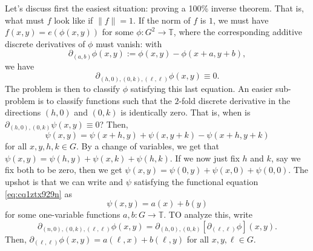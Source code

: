 \documentclass[reqno]{amsart} 
\numberwithin{theorem}{section}
\numberwithin{equation}{section}
\begin{document}
Let's discuss first the easiest situation: proving a 100\% inverse theorem.  That is, what must $f$ look like if $\lVert f \rVert = 1$.  If the norm of $f$ is $1$, we must have $f(x, y) = e(\phi(x, y))$ for some $\phi : G^2 \rightarrow \mathbb{T}$, where the corresponding additive discrete derivatives of $\phi$ must vanish: with
\begin{equation*}
  \partial_{(a, b)} \phi(x, y) := \phi(x, y) - \phi(x + a, y + b),
\end{equation*}
we have
\begin{equation*}
  \partial_{(h, 0),(0, k),(\ell, \ell)}
  \phi(x, y) \equiv 0.
\end{equation*}
The problem is then to classify $\phi$ satisfying this last equation.  An easier sub-problem is to classify functions such that the $2$-fold discrete derivative in the directions $(h, 0)$ and $(0, k)$ is identically zero.  That is, when is $\partial_{(h, 0),(0, k)} \psi(x, y) \equiv 0$?  Then,
\begin{equation}\label{eq:cq1ztx929n}
  \psi(x, y) = \psi(x + h, y) + \psi(x, y + k) - \psi(x + h, y + k)
\end{equation}
for all $x, y, h, k \in G$.  By a change of variables, we get that $\psi(x, y) = \psi(h, y) + \psi(x, k) + \psi(h, k)$.  If we now just fix $h$ and $k$, say we fix both to be zero, then we get $\psi(x, y) = \psi(0,y) + \psi(x, 0) + \psi(0, 0)$.  The upshot is that we can write and $\psi$ satisfying the functional equation \eqref{eq:cq1ztx929n} as
\begin{equation*}
  \psi(x, y) = a(x) + b(y)
\end{equation*}
for some one-variable functions $a, b : G \rightarrow \mathbb{T}$.  TO analyze this, write
\begin{equation*}
  \partial_{(n, 0),(0, k),(\ell, \ell)} \phi(x, y)
  = \partial_{(h, 0),(0, k)}[\partial_{(\ell, \ell)} \phi](x, y).
\end{equation*}
Then, $\partial_{(\ell, \ell)} \phi(x, y) = a(\ell, x) + b(\ell, y)$ for all $x, y, \ell \in G$.
\end{document}
